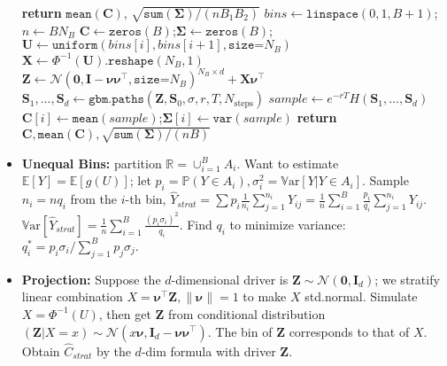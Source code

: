 \documentclass[9pt, landscape]{article}
\begin{document}
\begin{multicols*}{3}
\begin{itemize}
{{\begin{algorithmic}[1]
	\EndFor
	\EndFor
	\State \textbf{return} $\texttt{mean}(\bm{C})$, $\sqrt{\texttt{sum}(\bm{\Sigma})/(nB_1B_2)}$
	\EndFunction
	\State$bins\gets\texttt{linspace}(0, 1, B+1)$;\quad$n\gets BN_B$
	\State$\bm{C}\gets\texttt{zeros}(B)$;\quad$\bm{\Sigma}\gets\texttt{zeros}(B)$;
	\State$\bm{U}\gets\texttt{uniform}(bins[i], bins[i+1], \texttt{size=}N_B)$
	\State$\bm{X} \gets \Phi^{-1}(\bm{U})\texttt{.reshape}(N_B,1)$
	\State$\bm{Z}\gets \mathcal{N}(\bm{0}, \bm{I}-\bm{\nu}\bm{\nu}^{\top},\texttt{size=}N_B)^{N_B\times d}+\bm{X}\bm{\nu}^{\top}$
	\State$\bm{S}_1, ..., \bm{S}_d\gets \texttt{gbm.paths}(\bm{Z}, \bm{S}_0, \sigma, r, T, N_{\text{steps}})$
	\State$sample\gets e^{-rT}H(\bm{S}_1, ..., \bm{S}_d)$
	\State$\bm{C}[i]\gets\texttt{mean}(sample)$;\quad$\bm{\Sigma}[i]\gets\texttt{var}(sample)$
	\EndFor
	\State \textbf{return} $\bm{C}, \texttt{mean}(\bm{C}), \sqrt{\texttt{sum}(\bm{\Sigma})/(nB)}$
	\EndFunction
	\end{algorithmic}}}
	\item \textbf{Unequal Bins:} partition $\mathbb{R}=\cup^B_{i=1} A_i$. Want to estimate $\mathbb{E}[Y]=\mathbb{E}[g(U)]$; let $p_i = \mathbb{P}(Y\in A_i), \sigma_i^2 = \mathrm{\mathbb{V}ar}[Y|Y\in A_i]$. Sample $n_i = nq_i$ from the $i$-th bin, $\widehat{Y}_{strat}=\sum p_i \frac{1}{n_i}\sum_{j=1}^{n_i}Y_{ij} = \frac{1}{n}\sum_{i=1}^{B}\frac{p_i}{q_i}\sum_{j=1}^{n_i}Y_{ij}$. $\mathrm{\mathbb{V}ar}[\widehat{Y}_{strat}] = \frac{1}{n}\sum_{i=1}^B\frac{(p_i\sigma_i)^2}{q_i}$. Find $q_i$ to minimize variance: $q_i^*= p_i\sigma_i/\sum_{j=1}^B p_j \sigma_j$.
	\item \textbf{Projection:} Suppose the $d$-dimensional driver is $\bm{Z}\sim \mathcal{N}(\bm{0}, \bm{I}_d)$; we stratify linear combination $X= \bm{\nu}^{\top}\bm{Z}, \left\lVert \bm{\nu} \right\rVert=1$ to make $X$ std.normal. Simulate $X=\Phi^{-1}(U)$, then get $\bm{Z}$ from conditional distribution $(\bm{Z}|X=x) \sim \mathcal{N}(x\bm{\nu}, \bm{I}_d - \bm{\nu}\bm{\nu}^{\top})$. The bin of $\bm{Z}$ corresponds to that of $X$. Obtain $\widehat{C}_{strat}$ by the $d$-dim formula with driver $\bm{Z}$. 
	\end{itemize}

\end{multicols*}
\end{document}
